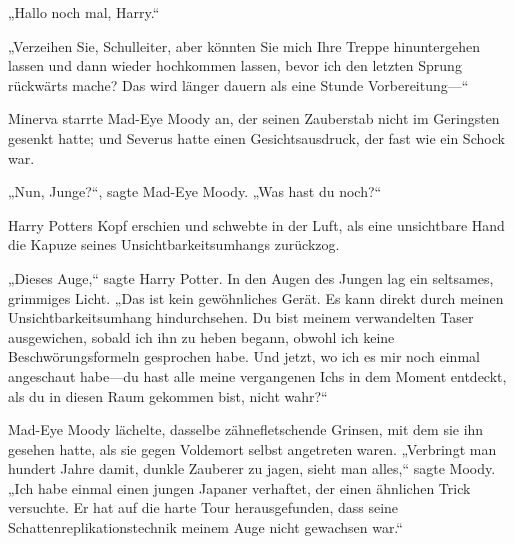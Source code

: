 \later

„Hallo noch mal, Harry.“

„Verzeihen Sie, Schulleiter, aber könnten Sie mich Ihre Treppe hinuntergehen lassen und dann wieder hochkommen lassen, bevor ich den letzten Sprung rückwärts mache? Das wird länger dauern als eine Stunde Vorbereitung—“

\later

Minerva starrte Mad-Eye Moody an, der seinen Zauberstab nicht im Geringsten gesenkt hatte; und Severus hatte einen Gesichtsausdruck, der fast wie ein Schock war.

„Nun, Junge?“, sagte Mad-Eye Moody. „Was hast du noch?“

Harry Potters Kopf erschien und schwebte in der Luft, als eine unsichtbare Hand die Kapuze seines Unsichtbarkeitsumhangs zurückzog.

„Dieses Auge,“ sagte Harry Potter. In den Augen des Jungen lag ein seltsames, grimmiges Licht. „Das ist kein gewöhnliches Gerät. Es kann direkt durch meinen Unsichtbarkeitsumhang hindurchsehen. Du bist meinem verwandelten Taser ausgewichen, sobald ich ihn zu heben begann, obwohl ich keine Beschwörungsformeln gesprochen habe. Und jetzt, wo ich es mir noch einmal angeschaut habe—du hast alle meine vergangenen Ichs in dem Moment entdeckt, als du in diesen Raum gekommen bist, nicht wahr?“

Mad-Eye Moody lächelte, dasselbe zähnefletschende Grinsen, mit dem sie ihn gesehen hatte, als sie gegen Voldemort selbst angetreten waren.
„Verbringt man hundert Jahre damit, dunkle Zauberer zu jagen, sieht man alles,“ sagte Moody. „Ich habe einmal einen jungen Japaner verhaftet, der einen ähnlichen Trick versuchte. Er hat auf die harte Tour herausgefunden, dass seine Schattenreplikationstechnik meinem Auge nicht gewachsen war.“

